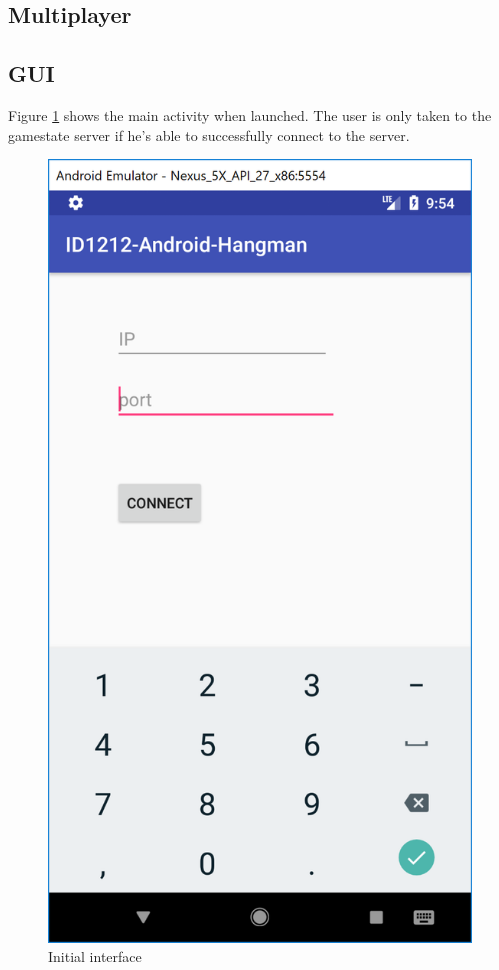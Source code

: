 \documentclass[a4paper]{scrartcl}
\begin{document}
\subsection{Multiplayer}



\subsection{GUI}

Figure \ref{fig:a1} shows the main activity when launched. 
The user is only taken to the gamestate server if he's able to successfully connect to the server.

\begin{figure}[h!]
  \begin{center}
    \includegraphics[scale=0.5]{Activity1.png}
    \caption{Initial interface}
    \label{fig:a1}
  \end{center}
\end{figure}
\end{document}
